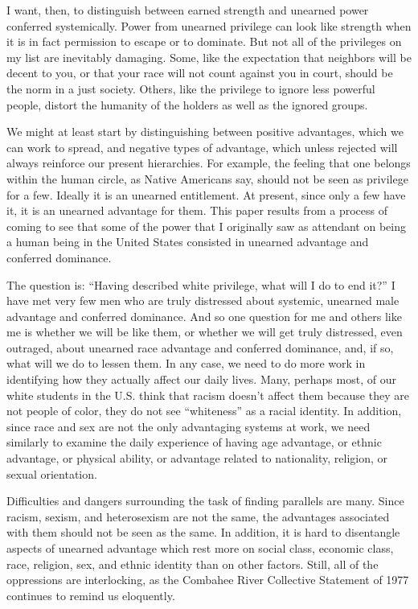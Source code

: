 \documentclass{article}
\begin{document}
I want, then, to distinguish between earned strength and unearned power
conferred systemically. Power from unearned privilege can look like strength
when it is in fact permission to escape or to dominate. But not all of the
privileges on my list are inevitably damaging. Some, like the expectation that
neighbors will be decent to you, or that your race will not count against you
in court, should be the norm in a just society. Others, like the privilege to
ignore less powerful people, distort the humanity of the holders as well as the
ignored groups.

We might at least start by distinguishing between positive advantages, which we
can work to spread, and negative types of advantage, which unless rejected will
always reinforce our present hierarchies. For example, the feeling that one
belongs within the human circle, as Native Americans say, should not be seen as
privilege for a few. Ideally it is an unearned entitlement. At present, since
only a few have it, it is an unearned advantage for them. This paper results
from a process of coming to see that some of the power that I originally saw as
attendant on being a human being in the United States consisted in unearned
advantage and conferred dominance.

The question is: ``Having described white privilege, what will I do to end
it?'' I have met very few men who are truly distressed about systemic, unearned
male advantage and conferred dominance. And so one question for me and others
like me is whether we will be like them, or whether we will get truly
distressed, even outraged, about unearned race advantage and conferred
dominance, and, if so, what will we do to lessen them. In any case, we need to
do more work in identifying how they actually affect our daily lives. Many,
perhaps most, of our white students in the U.S. think that racism doesn't
affect them because they are not people of color, they do not see ``whiteness''
as a racial identity.  In addition, since race and sex are not the only
advantaging systems at work, we need similarly to examine the daily experience
of having age advantage, or ethnic advantage, or physical ability, or advantage
related to nationality, religion, or sexual orientation.

Difficulties and dangers surrounding the task of finding parallels are many.
Since racism, sexism, and heterosexism are not the same, the advantages
associated with them should not be seen as the same. In addition, it is hard to
disentangle aspects of unearned advantage which rest more on social class,
economic class, race, religion, sex, and ethnic identity than on other factors.
Still, all of the oppressions are interlocking, as the Combahee River
Collective Statement of 1977 continues to remind us eloquently.
\end{document}
